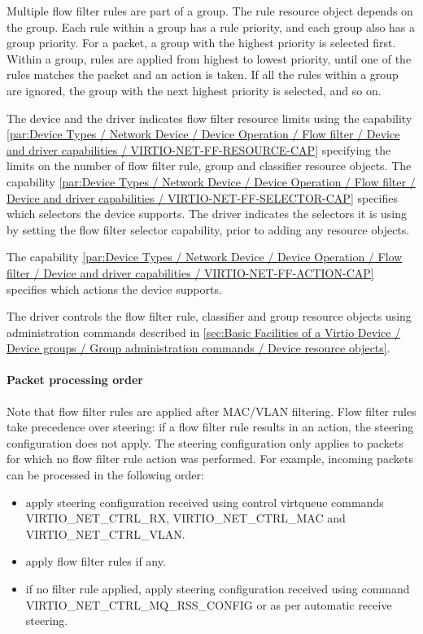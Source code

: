 Multiple flow filter rules are part of a group. The rule resource object
depends on the group. Each rule within a
group has a rule priority, and each group also has a group priority. For a
packet, a group with the highest priority is selected first. Within a group,
rules are applied from highest to lowest priority, until one of the rules
matches the packet and an action is taken. If all the rules within a group
are ignored, the group with the next highest priority is selected, and so on.

The device and the driver indicates flow filter resource limits using the capability
\ref{par:Device Types / Network Device / Device Operation / Flow filter / Device and driver capabilities / VIRTIO-NET-FF-RESOURCE-CAP} specifying the limits on the number of flow filter rule,
group and classifier resource objects. The capability \ref{par:Device Types / Network Device / Device Operation / Flow filter / Device and driver capabilities / VIRTIO-NET-FF-SELECTOR-CAP} specifies which selectors the device supports.
The driver indicates the selectors it is using by setting the flow
filter selector capability, prior to adding any resource objects.

The capability \ref{par:Device Types / Network Device / Device Operation / Flow filter / Device and driver capabilities / VIRTIO-NET-FF-ACTION-CAP} specifies which actions the device supports.

The driver controls the flow filter rule, classifier and group resource objects using
administration commands described in
\ref{sec:Basic Facilities of a Virtio Device / Device groups / Group administration commands / Device resource objects}.

\paragraph{Packet processing order}\label{sec:sec:Device Types / Network Device / Device Operation / Flow filter / Packet processing order}

Note that flow filter rules are applied after MAC/VLAN filtering. Flow filter
rules take precedence over steering: if a flow filter rule results in an action,
the steering configuration does not apply. The steering configuration only applies
to packets for which no flow filter rule action was performed. For example,
incoming packets can be processed in the following order:

\begin{itemize}
\item apply steering configuration received using control virtqueue commands
      VIRTIO_NET_CTRL_RX, VIRTIO_NET_CTRL_MAC and VIRTIO_NET_CTRL_VLAN.
\item apply flow filter rules if any.
\item if no filter rule applied, apply steering configuration received using command
      VIRTIO_NET_CTRL_MQ_RSS_CONFIG or as per automatic receive steering.
\end{itemize}

